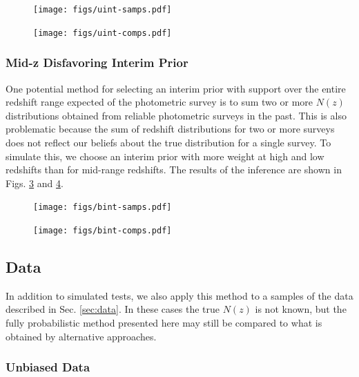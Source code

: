 \documentclass[preprint]{aastex}
\begin{document}
\begin{figure}
\texttt{[image: figs/uint-samps.pdf]}
\caption{}
\label{fig:intu-samp}
\end{figure}

\begin{figure}
\texttt{[image: figs/uint-comps.pdf]}
\caption{}
\label{fig:intu-comp}
\end{figure}

\subsubsection{Mid-z Disfavoring Interim Prior}
\label{sec:midz}

One potential method for selecting an interim prior with support over the 
entire redshift range expected of the photometric survey is to sum two or more 
$N(z)$ distributions obtained from reliable photometric surveys in the past.  
This is also problematic because the sum of redshift distributions for two or 
more surveys does not reflect our beliefs about the true distribution for a 
single survey.  To simulate this, we choose an interim prior with more weight 
at high and low redshifts than for mid-range redshifts.  The results of the 
inference are shown in Figs. \ref{fig:intb-samp} and \ref{fig:intb-comp}.

\begin{figure}
\texttt{[image: figs/bint-samps.pdf]}
\caption{}
\label{fig:intb-samp}
\end{figure}

\begin{figure}
\texttt{[image: figs/bint-comps.pdf]}
\caption{}
\label{fig:intb-comp}
\end{figure}

\clearpage
\subsection{Data}
\label{sec:boss}

In addition to simulated tests, we also apply this method to a samples of the 
data described in Sec. \ref{sec:data}.  In these cases the true $N(z)$ is not 
known, but the fully probabilistic method presented here may still be compared 
to what is obtained by alternative approaches.

\subsubsection{Unbiased Data}
\label{sec:unbiased}
\end{document}
